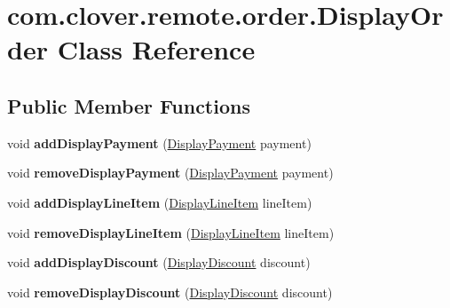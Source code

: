 \hypertarget{classcom_1_1clover_1_1remote_1_1order_1_1_display_order}{}\section{com.\+clover.\+remote.\+order.\+Display\+Order Class Reference}
\label{classcom_1_1clover_1_1remote_1_1order_1_1_display_order}
\subsection*{Public Member Functions}
\begin{DoxyCompactItemize}
\item 
\mbox{\label{classcom_1_1clover_1_1remote_1_1order_1_1_display_order_ac666c0167f632e3ce8fec5c940581a4a}} 
void {\bfseries add\+Display\+Payment} (\hyperlink{classcom_1_1clover_1_1remote_1_1order_1_1_display_payment}{Display\+Payment} payment)
\item 
\mbox{\label{classcom_1_1clover_1_1remote_1_1order_1_1_display_order_a93b6116a98724b2529dd5bce2d139e3b}} 
void {\bfseries remove\+Display\+Payment} (\hyperlink{classcom_1_1clover_1_1remote_1_1order_1_1_display_payment}{Display\+Payment} payment)
\item 
\mbox{\label{classcom_1_1clover_1_1remote_1_1order_1_1_display_order_a5e335d8943ca823431bc7467cf2762f7}} 
void {\bfseries add\+Display\+Line\+Item} (\hyperlink{classcom_1_1clover_1_1remote_1_1order_1_1_display_line_item}{Display\+Line\+Item} line\+Item)
\item 
\mbox{\label{classcom_1_1clover_1_1remote_1_1order_1_1_display_order_a384177b5a08daade83d86e77ad811dbe}} 
void {\bfseries remove\+Display\+Line\+Item} (\hyperlink{classcom_1_1clover_1_1remote_1_1order_1_1_display_line_item}{Display\+Line\+Item} line\+Item)
\item 
\mbox{\label{classcom_1_1clover_1_1remote_1_1order_1_1_display_order_aa28c0fbaed8ca1aaef98cb16cd306918}} 
void {\bfseries add\+Display\+Discount} (\hyperlink{classcom_1_1clover_1_1remote_1_1order_1_1_display_discount}{Display\+Discount} discount)
\item 
\mbox{\label{classcom_1_1clover_1_1remote_1_1order_1_1_display_order_abdafaa9185284865e4acf22550ea6ebd}} 
void {\bfseries remove\+Display\+Discount} (\hyperlink{classcom_1_1clover_1_1remote_1_1order_1_1_display_discount}{Display\+Discount} discount)
\end{DoxyCompactItemize}

